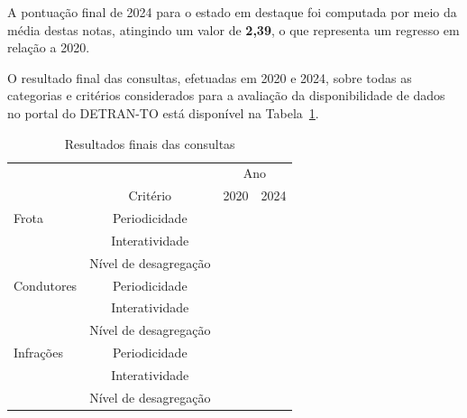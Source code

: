 \documentclass[
  a4paper,
]{article}
\begin{document}
A pontuação final de 2024 para o estado em destaque foi computada por
meio da média destas notas, atingindo um valor de \textbf{2,39}, o que
representa um regresso em relação a 2020.

O resultado final das consultas, efetuadas em 2020 e 2024, sobre todas
as categorias e critérios considerados para a avaliação da
disponibilidade de dados no portal do DETRAN-TO está disponível na
Tabela~\ref{tbl-final}.

\begin{longtable}{l|ccc}

\caption{\label{tbl-final}Resultados finais das consultas}

\tabularnewline

\toprule
\multicolumn{1}{l}{} &  & \multicolumn{2}{c}{Ano} \\ 
\cmidrule(lr){3-4}
\multicolumn{1}{l}{} & Critério & 2020 & 2024 \\ 
\midrule\addlinespace[2.5pt]
Frota & Periodicidade & \cellcolor[HTML]{F5951E}{\textcolor[HTML]{000000}{$6,7$}} & \cellcolor[HTML]{D7191C}{\textcolor[HTML]{FFFFFF}{$0,0$}} \\ 
 & Interatividade & \cellcolor[HTML]{F05E22}{\textcolor[HTML]{FFFFFF}{$3,3$}} & \cellcolor[HTML]{D7191C}{\textcolor[HTML]{FFFFFF}{$0,0$}} \\ 
 & Nível de desagregação & \cellcolor[HTML]{F5951E}{\textcolor[HTML]{000000}{$6,7$}} & \cellcolor[HTML]{D7191C}{\textcolor[HTML]{FFFFFF}{$0,0$}} \\ 
\midrule\addlinespace[2.5pt]
Condutores & Periodicidade & \cellcolor[HTML]{D7191C}{\textcolor[HTML]{FFFFFF}{$0,0$}} & \cellcolor[HTML]{D7191C}{\textcolor[HTML]{FFFFFF}{$0,0$}} \\ 
 & Interatividade & \cellcolor[HTML]{D7191C}{\textcolor[HTML]{FFFFFF}{$0,0$}} & \cellcolor[HTML]{D7191C}{\textcolor[HTML]{FFFFFF}{$0,0$}} \\ 
 & Nível de desagregação & \cellcolor[HTML]{D7191C}{\textcolor[HTML]{FFFFFF}{$0,0$}} & \cellcolor[HTML]{D7191C}{\textcolor[HTML]{FFFFFF}{$0,0$}} \\ 
\midrule\addlinespace[2.5pt]
Infrações & Periodicidade & \cellcolor[HTML]{D7191C}{\textcolor[HTML]{FFFFFF}{$0,0$}} & \cellcolor[HTML]{D7191C}{\textcolor[HTML]{FFFFFF}{$0,0$}} \\ 
 & Interatividade & \cellcolor[HTML]{D7191C}{\textcolor[HTML]{FFFFFF}{$0,0$}} & \cellcolor[HTML]{D7191C}{\textcolor[HTML]{FFFFFF}{$0,0$}} \\ 
 & Nível de desagregação & \cellcolor[HTML]{D7191C}{\textcolor[HTML]{FFFFFF}{$0,0$}} & \cellcolor[HTML]{D7191C}{\textcolor[HTML]{FFFFFF}{$0,0$}} \\ 

\end{longtable}
\end{document}
